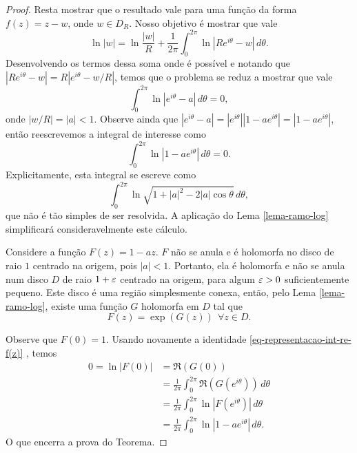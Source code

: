 \begin{proof}
        
        Resta mostrar que o resultado vale para uma função da forma $f(z) = z - w$,
        onde $w \in D_R$. Nosso objetivo é mostrar que vale
        \begin{equation*}
            \ln{|w|} = \ln{\frac{|w|}{R}} 
            + \frac{1}{2\pi}\int_{0}^{2\pi}\ln{|Re^{i\theta} - w|} \, d\theta.
        \end{equation*}
        Desenvolvendo os termos dessa soma onde é possível e notando que
        $|Re^{i\theta} - w| = R|e^{i\theta} - w/R|$, temos que o problema se 
        reduz a mostrar que vale
        \begin{equation*}
            \int_{0}^{2\pi}\ln{|e^{i\theta} - a|} \, d\theta = 0,
        \end{equation*}
        onde $|w/R| = |a| < 1$. Observe ainda que 
        $|e^{i\theta} - a| = |e^{i\theta}||1-ae^{i\theta}| = |1-ae^{i\theta}|$, 
        então reescrevemos a integral de interesse como
        \begin{equation*}
            \int_{0}^{2\pi}\ln{|1 - ae^{i\theta}|} \, d\theta = 0.
        \end{equation*}
        Explicitamente, esta integral se escreve como
        \begin{equation*}
            \int_{0}^{2\pi}\ln{\sqrt{1 + |a|^2 - 2|a|\cos{\theta}}} \, d\theta,
        \end{equation*}
        que não é tão simples de ser resolvida. A aplicação do 
        Lema \ref{lema-ramo-log} simplificará consideravelmente este cálculo. 
        
        Considere a função $F(z) = 1 - az$. $F$ não se anula e é holomorfa no 
        disco de raio $1$ centrado na origem, pois $|a| < 1$. Portanto, ela é
        holomorfa e não se anula num disco $D$ de raio $1 + \varepsilon$ centrado na origem,
        para algum $\varepsilon > 0$ suficientemente pequeno. 
        Este disco é uma região simplesmente
        conexa, então, pelo Lema \ref{lema-ramo-log}, existe uma função $G$ holomorfa
        em $D$ tal que 
        \begin{equation*}
            F(z) = \exp(G(z)) \ \ \forall z \in D.
        \end{equation*}
        
        Observe que $F(0) = 1$. Usando novamente a identidade
        \eqref{eq-representacao-int-re-f(z)} , temos
        \begin{align*}
             0 = \ln{|F(0)|} &= \Re{(G(0))}\\
                &= \frac{1}{2\pi} \int_{0}^{2\pi}\Re{(G(e^{i\theta}))} \, d\theta \\
                &= \frac{1}{2\pi} \int_{0}^{2\pi}\ln{|F(e^{i\theta})|} \, d\theta \\
                &= \frac{1}{2\pi} \int_{0}^{2\pi}\ln{|1 - ae^{i\theta}|} \, d\theta .
        \end{align*}
        O que encerra a prova do Teorema.
    \end{proof}
    
